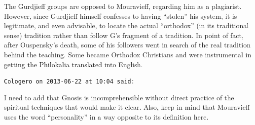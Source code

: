 \begin{footnotesize}
\begin{sffamily}
The Gurdjieff groups are opposed to Mouravieff, regarding him as a plagiarist. However, since Gurdjieff himself confesses to having ``stolen'' his system, it is legitimate, and even advisable, to locate the actual ``orthodox'' (in its traditional sense) tradition rather than follow G's fragment of a tradition. In point of fact, after Ouspensky's death, some of his followers went in search of the real tradition behind the teaching. Some became Orthodox Christians and were instrumental in getting the Philokalia translated into English.

\hfill

\texttt{Cologero on 2013-06-22 at 10:04 said:}

I need to add that Gnosis is incomprehensible without direct practice of the spiritual techniques that would make it clear. Also, keep in mind that Mouravieff uses the word ``personality'' in a way opposite to its definition here.

\hfill

\end{sffamily}
\end{footnotesize}

